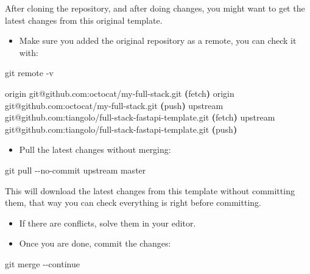\documentclass[
]{article}
\newenvironment{Shaded}{}{}
\newcommand{\AttributeTok}[1]{\textcolor[rgb]{0.49,0.56,0.16}{#1}}
\newcommand{\ErrorTok}[1]{\textcolor[rgb]{1.00,0.00,0.00}{\textbf{#1}}}
\newcommand{\ExtensionTok}[1]{#1}
\newcommand{\FunctionTok}[1]{\textcolor[rgb]{0.02,0.16,0.49}{#1}}
\newcommand{\KeywordTok}[1]{\textcolor[rgb]{0.00,0.44,0.13}{\textbf{#1}}}
\newcommand{\NormalTok}[1]{#1}
\providecommand{\tightlist}{%
  \setlength{\itemsep}{0pt}\setlength{\parskip}{0pt}}
\begin{document}
After cloning the repository, and after doing changes, you might want to
get the latest changes from this original template.

\begin{itemize}
\tightlist
\item
  Make sure you added the original repository as a remote, you can check
  it with:
\end{itemize}

\begin{Shaded}
\begin{Highlighting}[]
\FunctionTok{git}\NormalTok{ remote }\AttributeTok{{-}v}

\ExtensionTok{origin}\NormalTok{    git@github.com:octocat/my{-}full{-}stack.git }\ErrorTok{(}\ExtensionTok{fetch}\KeywordTok{)}
\ExtensionTok{origin}\NormalTok{    git@github.com:octocat/my{-}full{-}stack.git }\ErrorTok{(}\ExtensionTok{push}\KeywordTok{)}
\ExtensionTok{upstream}\NormalTok{    git@github.com:tiangolo/full{-}stack{-}fastapi{-}template.git }\ErrorTok{(}\ExtensionTok{fetch}\KeywordTok{)}
\ExtensionTok{upstream}\NormalTok{    git@github.com:tiangolo/full{-}stack{-}fastapi{-}template.git }\ErrorTok{(}\ExtensionTok{push}\KeywordTok{)}
\end{Highlighting}
\end{Shaded}

\begin{itemize}
\tightlist
\item
  Pull the latest changes without merging:
\end{itemize}

\begin{Shaded}
\begin{Highlighting}[]
\FunctionTok{git}\NormalTok{ pull }\AttributeTok{{-}{-}no{-}commit}\NormalTok{ upstream master}
\end{Highlighting}
\end{Shaded}

This will download the latest changes from this template without
committing them, that way you can check everything is right before
committing.

\begin{itemize}
\item
  If there are conflicts, solve them in your editor.
\item
  Once you are done, commit the changes:
\end{itemize}

\begin{Shaded}
\begin{Highlighting}[]
\FunctionTok{git}\NormalTok{ merge }\AttributeTok{{-}{-}continue}
\end{Highlighting}
\end{Shaded}
\end{document}

